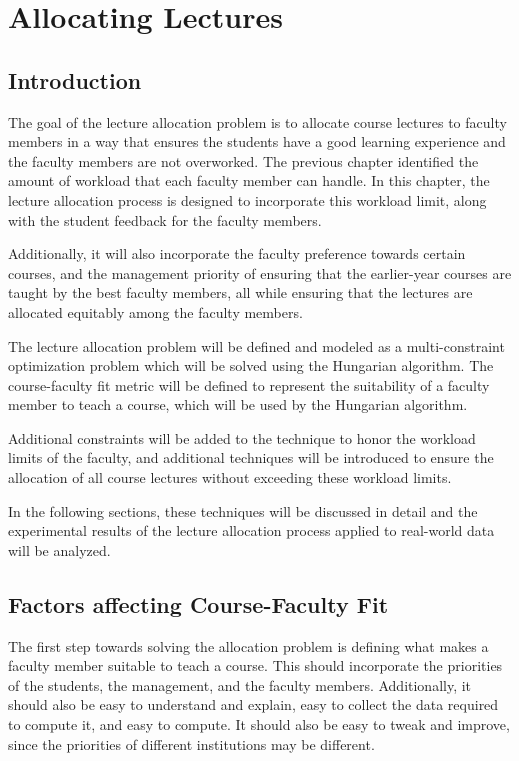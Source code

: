 
\chapter{Allocating Lectures}

\section{Introduction}

The goal of the lecture allocation problem is to allocate course lectures to faculty members in a way that ensures the students have a good learning experience and the faculty members are not overworked. The previous chapter identified the amount of workload that each faculty member can handle. In this chapter, the lecture allocation process is designed to incorporate this workload limit, along with the student feedback for the faculty members.

Additionally, it will also incorporate the faculty preference towards certain courses, and the management priority of ensuring that the earlier-year courses are taught by the best faculty members, all while ensuring that the lectures are allocated equitably among the faculty members.

The lecture allocation problem will be defined and modeled as a multi-constraint optimization problem which will be solved using the Hungarian algorithm. The course-faculty fit metric will be defined to represent the suitability of a faculty member to teach a course, which will be used by the Hungarian algorithm.

Additional constraints will be added to the technique to honor the workload limits of the faculty, and additional techniques will be introduced to ensure the allocation of all course lectures without exceeding these workload limits.

In the following sections, these techniques will be discussed in detail and the experimental results of the lecture allocation process applied to real-world data will be analyzed.

\section{Factors affecting Course-Faculty Fit}

The first step towards solving the allocation problem is defining what makes a faculty member suitable to teach a course. This should incorporate the priorities of the students, the management, and the faculty members. Additionally, it should also be easy to understand and explain, easy to collect the data required to compute it, and easy to compute. It should also be easy to tweak and improve, since the priorities of different institutions may be different.

